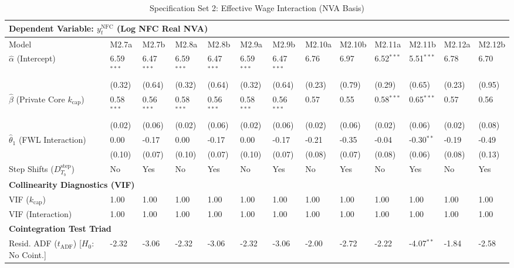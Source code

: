 \begin{table}[H]
\centering
\setlength{\tabcolsep}{2.5pt}
\caption{Specification Set 2: Effective Wage Interaction (NVA Basis)}
\label{tab:specA_set2_nva}
\scriptsize
\begin{tabular}{p{3.8cm}p{1.1cm}p{1.1cm}p{1.1cm}p{1.1cm}p{1.1cm}p{1.1cm}p{1.1cm}p{1.1cm}p{1.1cm}p{1.1cm}p{1.1cm}p{1.1cm}}
\toprule
\multicolumn{13}{l}{\textbf{Dependent Variable: $y_t^{\text{NFC}}$ (Log NFC Real NVA)}} \\
\midrule
Model & M2.7a & M2.7b & M2.8a & M2.8b & M2.9a & M2.9b & M2.10a & M2.10b & M2.11a & M2.11b & M2.12a & M2.12b \\
\midrule
$\hat{\alpha}$ (Intercept) & 6.59$^{***}$ & 6.47$^{***}$ & 6.59$^{***}$ & 6.47$^{***}$ & 6.59$^{***}$ & 6.47$^{***}$ & 6.76 & 6.97 & 6.52$^{***}$ & 5.51$^{***}$ & 6.78 & 6.70 \\
 & (0.32) & (0.64) & (0.32) & (0.64) & (0.32) & (0.64) & (0.23) & (0.79) & (0.29) & (0.65) & (0.23) & (0.95) \\
$\hat{\beta}$ (Private Core $k_{\text{cap}}$) & 0.58$^{***}$ & 0.56$^{***}$ & 0.58$^{***}$ & 0.56$^{***}$ & 0.58$^{***}$ & 0.56$^{***}$ & 0.57 & 0.55 & 0.58$^{***}$ & 0.65$^{***}$ & 0.57 & 0.56 \\
 & (0.02) & (0.06) & (0.02) & (0.06) & (0.02) & (0.06) & (0.02) & (0.06) & (0.02) & (0.06) & (0.02) & (0.08) \\
$\hat{\theta}_1$ (FWL Interaction) & 0.00 & -0.17 & 0.00 & -0.17 & 0.00 & -0.17 & -0.21 & -0.35 & -0.04 & -0.30$^{**}$ & -0.19 & -0.49 \\
 & (0.10) & (0.07) & (0.10) & (0.07) & (0.10) & (0.07) & (0.08) & (0.07) & (0.08) & (0.06) & (0.08) & (0.13) \\
Step Shifts ($D_{T_b}^{\text{step}}$) & No & Yes & No & Yes & No & Yes & No & Yes & No & Yes & No & Yes \\
\midrule
\multicolumn{13}{l}{\textbf{Collinearity Diagnostics (VIF)}} \\
VIF ($k_{\text{cap}}$) & 1.00 & 1.00 & 1.00 & 1.00 & 1.00 & 1.00 & 1.00 & 1.00 & 1.00 & 1.00 & 1.00 & 1.00 \\
VIF (Interaction) & 1.00 & 1.00 & 1.00 & 1.00 & 1.00 & 1.00 & 1.00 & 1.00 & 1.00 & 1.00 & 1.00 & 1.00 \\
\midrule
\multicolumn{13}{l}{\textbf{Cointegration Test Triad}} \\
Resid. ADF ($t_{\text{ADF}}$) [$H_0$: No Coint.] & -2.32 & -3.06 & -2.32 & -3.06 & -2.32 & -3.06 & -2.00 & -2.72 & -2.22 & -4.07$^{**}$ & -1.84 & -2.58 \\

\end{tabular}
\end{table}
